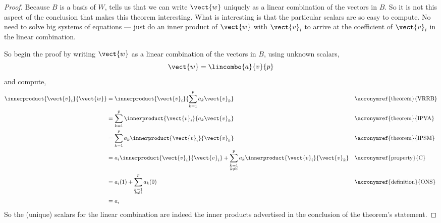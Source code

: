 %
\begin{proof}
Because $B$ is a basis of $W$,  tells us that we can write $\vect{w}$ uniquely as a linear combination of the vectors in $B$.  So it is not this aspect of the conclusion that makes this theorem interesting.  What is interesting is that the particular scalars are so easy to compute.  No need to solve big systems of equations --- just do an inner product of $\vect{w}$ with $\vect{v}_i$ to arrive at the coefficient of $\vect{v}_i$ in the linear combination.\par
%
So begin the proof by writing $\vect{w}$ as a linear combination of the vectors in $B$, using unknown scalars,
%
\begin{equation*}
\vect{w}=\lincombo{a}{v}{p}
\end{equation*}
%
and compute,
%
\begin{align*}
\innerproduct{\vect{v}_i}{\vect{w}}
&=\innerproduct{\vect{v}_i}{\sum_{k=1}^{p}a_k\vect{v}_k}
&&\text{\acronymref{theorem}{VRRB}}\\
%
&=\sum_{k=1}^{p}\innerproduct{\vect{v}_i}{a_k\vect{v}_k}
&&\text{\acronymref{theorem}{IPVA}}\\
%
&=\sum_{k=1}^{p}a_k\innerproduct{\vect{v}_i}{\vect{v}_k}
&&\text{\acronymref{theorem}{IPSM}}\\
%
&=a_i\innerproduct{\vect{v}_i}{\vect{v}_i}+
\sum_{\substack{k=1\\k\neq i}}^{p}a_k\innerproduct{\vect{v}_i}{\vect{v}_k}
&&\text{\acronymref{property}{C}}\\
%
&=a_i(1)+\sum_{\substack{k=1\\k\neq i}}^{p}a_k(0)
&&\text{\acronymref{definition}{ONS}}\\
%
&=a_i
\end{align*}
%
So the (unique) scalars for the linear combination are indeed the inner products advertised in the conclusion of the theorem's statement.
\end{proof}
%
%
